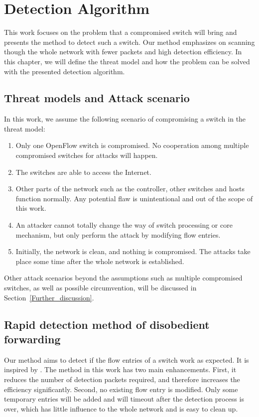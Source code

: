 \chapter{Detection Algorithm}
This work focuses on the problem that a compromised switch will bring and presents the method to detect such a switch. Our method emphasizes on scanning though the whole network with fewer packets and high detection efficiency. In this chapter, we will define the threat model and how the problem can be solved with the presented detection algorithm.

\section{Threat models and Attack scenario}
In this work, we assume the following scenario of compromising a switch in the threat model:
\begin{enumerate}
\item
Only one OpenFlow switch is compromised. No cooperation among multiple compromised switches for attacks will happen. 
\item
The switches are able to access the Internet. 
\item
Other parts of the network such as the controller, other switches and hosts function normally. Any potential flaw is unintentional and out of the scope of this work.
\item
An attacker cannot totally change the way of switch processing or core mechanism, but only perform the attack by modifying flow entries.
\item
Initially, the network is clean, and nothing is compromised. The attacks take place some time after the whole network is established.
\end{enumerate}

Other attack scenarios beyond the assumptions such as multiple compromised switches, as well as possible circumvention, will be discussed in Section~\ref{Further_discussion}.

\section{Rapid detection method of disobedient forwarding}
Our method aims to detect if the flow entries of a switch work as expected. It is inspired by \cite{CKGL15}. The method in this work has two main enhancements. First, it reduces the number of detection packets required, and therefore increases the efficiency significantly. Second, no existing flow entry is modified. Only some temporary entries will be added and will timeout after the detection process is over, which has little influence to the whole network and is easy to clean up. 

